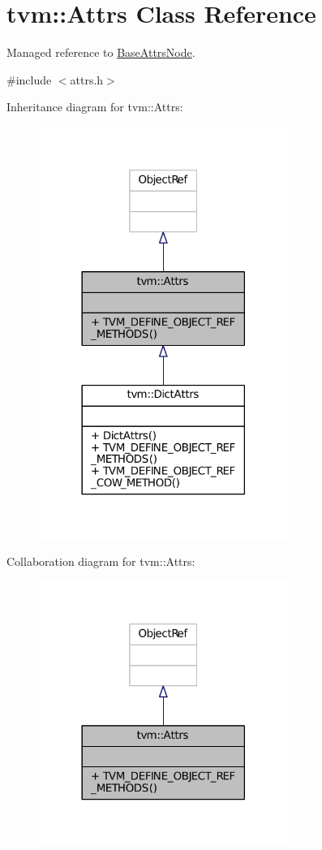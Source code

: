 \hypertarget{classtvm_1_1Attrs}{}\section{tvm\+:\+:Attrs Class Reference}
\label{classtvm_1_1Attrs}


Managed reference to \hyperlink{classtvm_1_1BaseAttrsNode}{Base\+Attrs\+Node}.  




{\ttfamily \#include $<$attrs.\+h$>$}



Inheritance diagram for tvm\+:\+:Attrs\+:
\nopagebreak
\begin{figure}[H]
\begin{center}
\leavevmode
\includegraphics[width=230pt]{classtvm_1_1Attrs__inherit__graph}
\end{center}
\end{figure}


Collaboration diagram for tvm\+:\+:Attrs\+:
\nopagebreak
\begin{figure}[H]
\begin{center}
\leavevmode
\includegraphics[width=230pt]{classtvm_1_1Attrs__coll__graph}
\end{center}
\end{figure}
